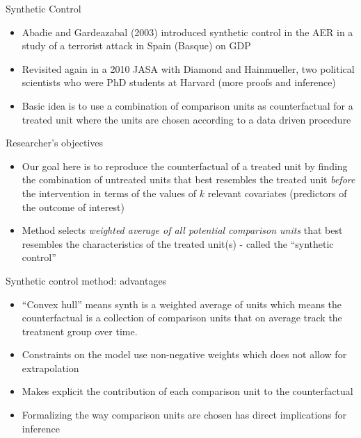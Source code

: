 \documentclass{beamer}
\begin{document}
\begin{frame}{Synthetic Control}
	
	\begin{itemize}
	\item Abadie and Gardeazabal (2003) introduced synthetic control in the AER in a study of a terrorist attack in Spain (Basque) on GDP
	\item Revisited again in a 2010 JASA with Diamond and Hainmueller, two political scientists who were PhD students at Harvard (more proofs and inference)
	\item Basic idea is to use a combination of comparison units as counterfactual for a treated unit where the units are chosen according to a data driven procedure
	\end{itemize}
\end{frame}


\begin{frame}{Researcher's objectives}

\begin{itemize}
	\item Our goal here is to reproduce the counterfactual of a treated unit by finding the combination of untreated units that best resembles the treated unit \emph{before} the intervention in terms of the values of $k$ relevant covariates (predictors of the outcome of interest)
	\item Method selects \emph{weighted average of all potential comparison units} that best resembles the characteristics of the treated unit(s) - called the ``synthetic control''
\end{itemize}

\end{frame}

\begin{frame}{Synthetic control method: advantages}
	
	\begin{itemize}
	\item ``Convex hull'' means synth is a weighted average of units which means the counterfactual is a collection of comparison units that on average track the treatment group over time.
	\item Constraints on the model use non-negative weights which does not allow for extrapolation 
	\item Makes explicit the contribution of each comparison unit to the counterfactual 
	\item Formalizing the way comparison units are chosen has direct implications for inference
	\end{itemize}
\end{frame}
\end{document}
